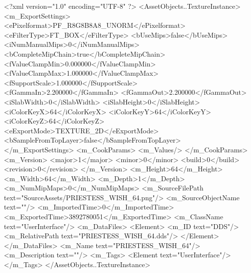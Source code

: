 <?xml version="1.0" encoding="UTF-8" ?>
<AssetObjects..TextureInstance>
	<m_ExportSettings>
		<ePixelformat>PF_R8G8B8A8_UNORM</ePixelformat>
		<eFilterType>FT_BOX</eFilterType>
		<bUseMips>false</bUseMips>
		<iNumManualMips>0</iNumManualMips>
		<bCompleteMipChain>true</bCompleteMipChain>
		<fValueClampMin>0.000000</fValueClampMin>
		<fValueClampMax>1.000000</fValueClampMax>
		<fSupportScale>1.000000</fSupportScale>
		<fGammaIn>2.200000</fGammaIn>
		<fGammaOut>2.200000</fGammaOut>
		<iSlabWidth>0</iSlabWidth>
		<iSlabHeight>0</iSlabHeight>
		<iColorKeyX>64</iColorKeyX>
		<iColorKeyY>64</iColorKeyY>
		<iColorKeyZ>64</iColorKeyZ>
		<eExportMode>TEXTURE_2D</eExportMode>
		<bSampleFromTopLayer>false</bSampleFromTopLayer>
	</m_ExportSettings>
	<m_CookParams>
		<m_Values/>
	</m_CookParams>
	<m_Version>
		<major>1</major>
		<minor>0</minor>
		<build>0</build>
		<revision>0</revision>
	</m_Version>
	<m_Height>64</m_Height>
	<m_Width>64</m_Width>
	<m_Depth>1</m_Depth>
	<m_NumMipMaps>0</m_NumMipMaps>
	<m_SourceFilePath text="SourceAssets/PRIESTESS_WISH_64.png"/>
	<m_SourceObjectName text=""/>
	<m_ImportedTime>0</m_ImportedTime>
	<m_ExportedTime>3892780051</m_ExportedTime>
	<m_ClassName text="UserInterface"/>
	<m_DataFiles>
		<Element>
			<m_ID text="DDS"/>
			<m_RelativePath text="PRIESTESS_WISH_64.dds"/>
		</Element>
	</m_DataFiles>
	<m_Name text="PRIESTESS_WISH_64"/>
	<m_Description text=""/>
	<m_Tags>
		<Element text="UserInterface"/>
	</m_Tags>
</AssetObjects..TextureInstance>

